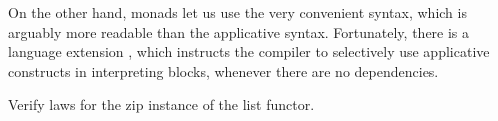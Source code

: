 \documentclass[DaoFP]{subfiles}
\begin{document}
On the other hand, monads let us use the very convenient  syntax, which is arguably more readable than the applicative syntax. Fortunately, there is a language extension , which instructs the compiler to selectively use applicative constructs in interpreting  blocks, whenever there are no dependencies.

\begin{exercise}
Verify  laws for the zip instance of the list functor.
\end{exercise}
\end{document}
